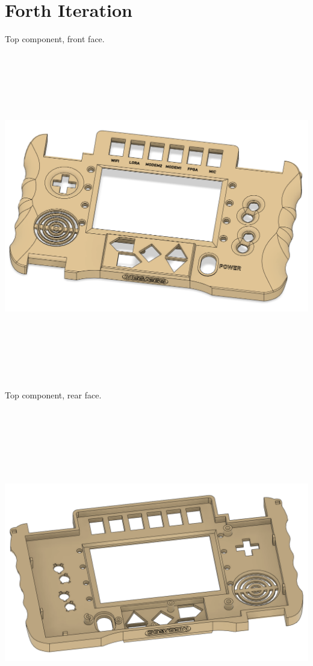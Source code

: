 \section{Forth Iteration}
Top component, front face. \newline
\includegraphics[width=15cm,height=15cm,keepaspectratio]{Figures/iteration4_top_front.png} \newline
Top component, rear face. \newline
\includegraphics[width=15cm,height=15cm,keepaspectratio]{Figures/iteration4_top_back.png} \newpage
